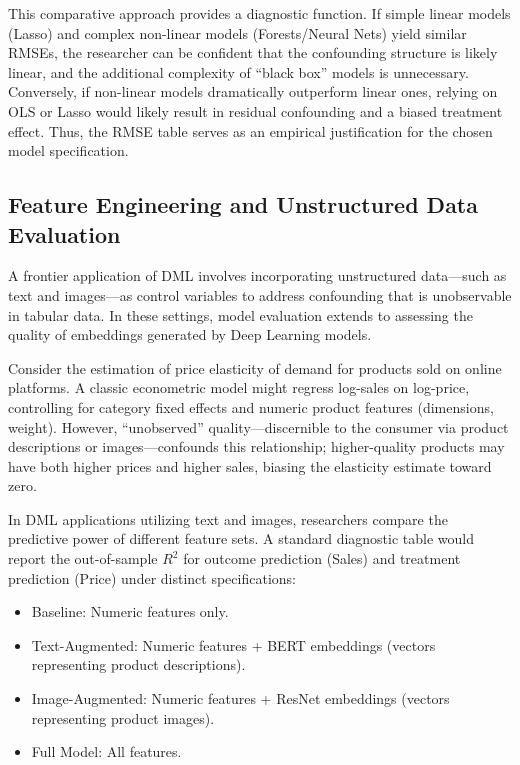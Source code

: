 \documentclass[12pt,a4paper]{article}
\begin{document}
This comparative approach provides a diagnostic function. If simple linear models (Lasso) and complex non-linear models (Forests/Neural Nets) yield similar RMSEs, the researcher can be confident that the confounding structure is likely linear, and the additional complexity of ``black box'' models is unnecessary. Conversely, if non-linear models dramatically outperform linear ones, relying on OLS or Lasso would likely result in residual confounding and a biased treatment effect. Thus, the RMSE table serves as an empirical justification for the chosen model specification.

\subsection{Feature Engineering and Unstructured Data Evaluation}

A frontier application of DML involves incorporating unstructured data---such as text and images---as control variables to address confounding that is unobservable in tabular data. In these settings, model evaluation extends to assessing the quality of embeddings generated by Deep Learning models.

Consider the estimation of price elasticity of demand for products sold on online platforms. A classic econometric model might regress log-sales on log-price, controlling for category fixed effects and numeric product features (dimensions, weight). However, ``unobserved'' quality---discernible to the consumer via product descriptions or images---confounds this relationship; higher-quality products may have both higher prices and higher sales, biasing the elasticity estimate toward zero.

In DML applications utilizing text and images, researchers compare the predictive power of different feature sets. A standard diagnostic table would report the out-of-sample $R^2$ for outcome prediction (Sales) and treatment prediction (Price) under distinct specifications:
\begin{itemize}
\item Baseline: Numeric features only.
\item Text-Augmented: Numeric features + BERT embeddings (vectors representing product descriptions).
\item Image-Augmented: Numeric features + ResNet embeddings (vectors representing product images).
\item Full Model: All features.
\end{itemize}
\end{document}
